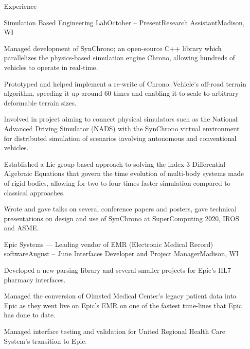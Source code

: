 \documentclass{resume} %
\begin{document}

\begin{rSection}{Experience}

\begin{rSubsection}{Simulation Based Engineering Lab}{October  -- Present}{Research Assistant}{Madison, WI}
\item Managed development of SynChrono; an open-source C++ library which parallelizes the physics-based simulation engine Chrono, allowing hundreds of vehicles to operate in real-time. 
\item Prototyped and helped implement a re-write of Chrono::Vehicle's off-road terrain algorithm, speeding it up around 60 times and enabling it to scale to arbitrary deformable terrain sizes.
\item Involved in project aiming to connect physical simulators such as the National Advanced Driving Simulator (NADS) with the SynChrono virtual environment for distributed simulation of scenarios involving autonomous and conventional vehicles.
\item Established a Lie group-based approach to solving the index-3 Differential Algebraic Equations that govern the time evolution of multi-body systems made of rigid bodies, allowing for two to four times faster simulation compared to classical approaches.
\item Wrote and gave talks on several conference papers and posters, gave technical presentations on design and use of SynChrono at SuperComputing 2020, IROS and ASME.
\end{rSubsection}

\begin{rSubsection}{Epic Systems \textnormal{--- Leading vendor of EMR (Electronic Medical Record) software}}{August  -- June }{Interfaces Developer and Project Manager}{Madison, WI}
\item Developed a new parsing library and several smaller projects for Epic's HL7 pharmacy interfaces.
\item Managed the conversion of Olmsted Medical Center's legacy patient data into Epic as they went live on Epic's EMR on one of the fastest time-lines that Epic has done to date.
\item Managed interface testing and validation for United Regional Health Care System's transition to Epic.
\end{rSubsection}


\end{rSection}
\end{document}
